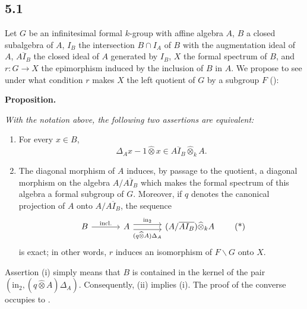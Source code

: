 
\subsection*{5.1}
\label{sga3:VIIB:5.1}

Let \(G\) be an infinitesimal formal \(k\)-group with affine algebra
\(A\), \(B\) a closed subalgebra of \(A\), \(I_B\) the intersection
\(B\cap I_A\) of \(B\) with the augmentation ideal of \(A\),
\(\overline{AI_B}\) the closed ideal of \(A\) generated by \(I_B\),
\(X\) the formal spectrum of \(B\), and \(r:G\to X\) the epimorphism
induced by the inclusion of \(B\) in \(A\). We propose to see under
what condition \(r\) makes \(X\) the left quotient of \(G\) by a
subgroup \(F\) \textup{()}:

\medskip
\noindent\textbf{Proposition.}
\label{sga3:VIIB:5.1:proposition}
{\itshape With the notation above, the following two assertions are
equivalent:
\begin{enumerate}
\item[\textup{(i)}] For every \(x\in B\),
\[
  \Delta_Ax-1\widehat\otimes x
  \in
  \overline{AI_B}\widehat\otimes_kA.
\]

\item[\textup{\SGAInlineRefTarget{sga3:VIIB:5.1:proposition:item:ii}(ii)}] The diagonal morphism of \(A\) induces, by passage to the
quotient, a diagonal morphism on the algebra \(A/\overline{AI_B}\)
which makes the formal spectrum of this algebra a formal subgroup of
\(G\). Moreover, if \(q\) denotes the canonical projection of \(A\)
onto \(A/\overline{AI_B}\), the sequence
\[
  \begin{tikzcd}[column sep=3.4em]
    B \arrow[r,"\mathrm{incl.}"]
    & A
      \arrow[r,shift left=0.7ex,"\mathrm{in}_2"]
      \arrow[r,shift right=0.7ex,"(q\widehat\otimes A)\Delta_A"']
    & (A/\overline{AI_B})\widehat\otimes_kA
  \end{tikzcd}
  \tag{*}
\]
is exact; in other words, \(r\) induces an isomorphism of
\(F\backslash G\) onto \(X\).
\end{enumerate}}

Assertion \textup{(i)} simply means that \(B\) is contained in the
kernel of the pair \((\mathrm{in}_2,(q\widehat\otimes A)\Delta_A)\).
Consequently, \textup{(ii)} implies \textup{(i)}. The proof of the
converse occupies  to .

